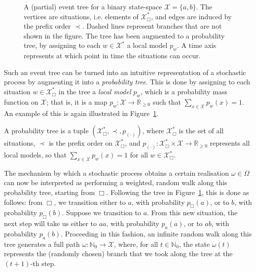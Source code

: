 \documentclass[graybox]{svmult}
\newcommand{\nats}{\mathbb{N}}
\newcommand{\natswith}{\nats_{0}}
\newcommand{\reals}{\mathbb{R}}
\newcommand{\realsnonneg}{\reals_{\geq 0}}
\newcommand{\states}{\mathcal{X}}
\begin{document}
\begin{figure}
\caption{A (partial) event tree for a binary state-space $\states=\{a,b\}$. The vertices are situations, i.e. elements of $\states^*_\Box$, and edges are induced by the prefix order $\prec$. Dashed lines represent branches that are not shown in the figure. The tree has been augmented to a probability tree, by assigning to each $w\in\states^*$ a local model $p_w$. A time axis represents at which point in time the situations can occur.}
\label{fig:example_event_tree}
\end{figure}

Such an event tree can be turned into an intuitive representation of a stochastic process by augmenting it into a \emph{probability tree}. This is done by assigning to each situation $w\in\states^*_\Box$ in the tree a \emph{local model} $p_{w}$, which is a probability mass function on $\states$; that is, it is a map $p_w:\states\to\realsnonneg$ such that $\sum_{x\in\states}p_w(x)=1$. An example of this is again illustrated in Figure~\ref{fig:example_event_tree}.
\begin{definition}\label{def:prob_tree}
A probability tree is a tuple $(\states^*_\Box,\prec,p_{(\cdot)})$, where $\states^*_\Box$ is the set of all situations, $\prec$ is the prefix order on $\states^*_\Box$, and $p_{(\cdot)}:\states^*_\Box\times\states\to\realsnonneg$ represents all local models, so that $\sum_{x\in\states}p_w(x)=1$ for all $w\in\states^*_\Box$.
\end{definition}

The mechanism by which a stochastic process obtains a certain realisation $\omega\in\Omega$ can now be interpreted as performing a weighted, random walk along this probability tree, starting from $\Box$. Following the tree in Figure~\ref{fig:example_event_tree}, this is done as follows: from $\Box$, we transition either to $a$, with probability $p_\Box(a)$, or to $b$, with probability $p_\Box(b)$. Suppose we transition to $a$. From this new situation, the next step will take us either to $aa$, with probability $p_a(a)$, or to $ab$, with probability $p_a(b)$. Proceeding in this fashion, an infinite random walk along this tree generates a full path $\omega:\natswith\to\states$, where, for all $t\in\natswith$, the state $\omega(t)$ represents the (randomly chosen) branch that we took along the tree at the $(t+1)$-th step.
\end{document}
